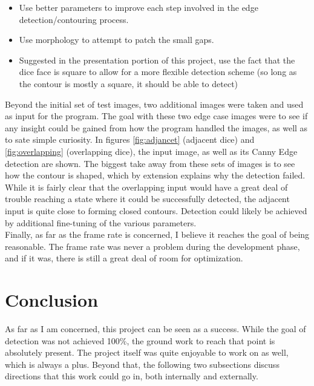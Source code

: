 \documentclass[journal]{IEEEtran}
\begin{document}
\begin{itemize}
	\item Use better parameters to improve each step involved in the edge detection/contouring process.
	\item Use morphology to attempt to patch the small gaps.
	\item Suggested in the presentation portion of this project, use the fact that the dice face is square to allow for a more flexible detection scheme (so long as the contour is mostly a square, it should be able to detect)
	
\end{itemize}


Beyond the initial set of test images, two additional images were taken and used as input for the program. The goal with these two edge case images were to see if any insight could be gained from how the program handled the images, as well as to sate simple curiosity. In figures \ref{fig:adjancet} (adjacent dice) and \ref{fig:overlapping} (overlapping dice), the input image, as well as its Canny Edge detection are shown. The biggest take away from these sets of images is to see how the contour is shaped, which by extension explains why the detection failed. While it is fairly clear that the overlapping input would have a great deal of trouble reaching a state where it could be successfully detected, the adjacent input is quite close to forming closed contours. Detection could likely be achieved by additional fine-tuning of the various parameters.\\

Finally, as far as the frame rate is concerned, I believe it reaches the goal of being reasonable. The frame rate was never a problem during the development phase, and if it was, there is still a great deal of room for optimization.\\



\section{Conclusion}
As far as I am concerned, this project can be seen as a success. While the goal of detection was not achieved 100\%, the ground work to reach that point is absolutely present. The project itself was quite enjoyable to work on as well, which is always a plus. Beyond that, the following two subsections discuss directions that this work could go in, both internally and externally.\\
\end{document}
